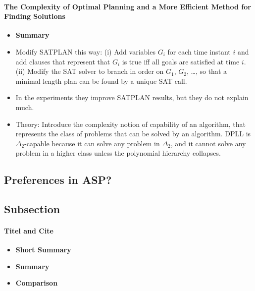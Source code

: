 \paragraph{The Complexity of Optimal Planning and a More Efficient
               Method for Finding Solutions \cite{raygins08}}
\begin{itemize}
	\item \textbf{Summary}
	\item Modify SATPLAN this way: (i) Add variables $G_i$ for each time instant $i$ and add clauses 
				that represent that $G_i$ is true iff all goals are satisfied at time $i$.
				(ii) Modify the SAT solver to branch in order on $G_1$, $G_2$, \ldots, so that a minimal length plan 
				can be found by a unique SAT call.
	\item In the experiments they improve SATPLAN results, but they do not explain much.
	\item Theory: Introduce the complexity notion of capability of an algorithm, that represents the class of problems that can be solved
				by an algorithm. DPLL is $\Delta_2$-capable because it can solve any problem in $\Delta_2$, 
				and it cannot solve any problem in a higher class unless the polynomial hierarchy collapses.
\end{itemize}


\subsection{Preferences in ASP?}	




\subsection{Subsection}	

\paragraph{Titel and Cite}
\begin{itemize}
	\item \textbf{Short Summary}
	\item \textbf{Summary}
	\item \textbf{Comparison}
\end{itemize}

